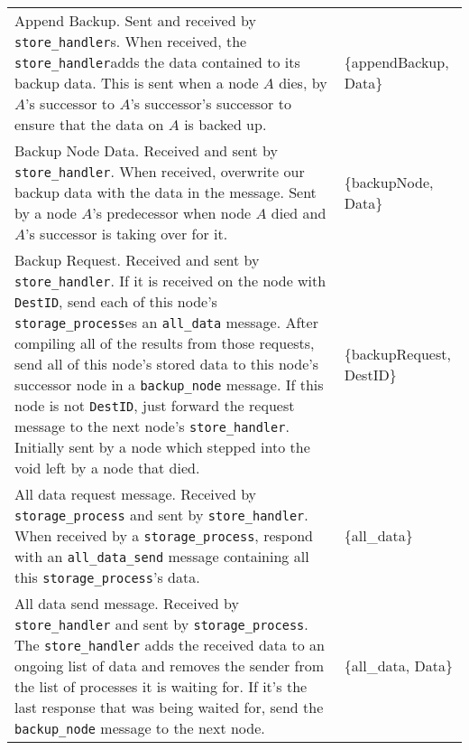 \documentclass[12pt,letterpaper]{article}
\renewcommand{\tt}[1]{\texttt{#1}}
\newcommand{\sh}{\tt{store\_handler}}
\renewcommand{\sp}{\tt{storage\_process}}
\begin{document}
\begin{longtable}{p{4.5in}T}
Append Backup. Sent and received by \sh s. When received, the \sh adds the data contained to its backup data. This is sent when a node $A$ dies, by $A$'s successor to $A$'s successor's successor to ensure that the data on $A$ is backed up. &
\{appendBackup, Data\}\\

Backup Node Data. Received and sent by \sh. When received, overwrite our backup data with the data in the message. Sent by a node $A$'s predecessor when node $A$ died and $A$'s successor is taking over for it.&
\{backupNode, Data\} \\

Backup Request.  Received and sent by \sh.  If it is received on the node with \tt{DestID}, send each of this node's \sp es an \tt{all\_data} message.  After compiling all of the results from those requests, send all of this node's stored data to this node's successor node in a \tt{backup\_node} message.  If this node is not \tt{DestID}, just forward the request message to the next node's \sh. Initially sent by a node which stepped into the void left by a node that died.  & 
\{backupRequest, DestID\} \\

All data request message.  Received by \sp{} and sent by \sh.  When received by a \sp, respond with an \tt{all\_data\_send} message containing all this \sp's data.  & 
\{all\_data\} \\

All data send message.  Received by \sh{} and sent by \sp.  The \sh{} adds the received data to an ongoing list of data and removes the sender from the list of processes it is waiting for. If it's the last response that was being waited for, send the \tt{backup\_node} message to the next node. & 
\{all\_data, Data\}

\end{longtable}

\clearpage
\onehalfspacing
\end{document}
